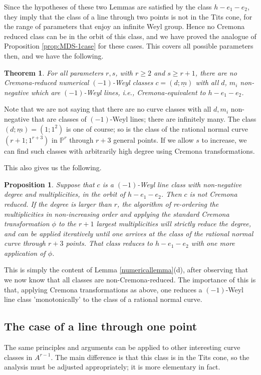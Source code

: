 \documentclass[12pt]{article}
\numberwithin{equation}{section}
\newtheorem{theorem}[equation]{Theorem}
\newtheorem{proposition}[equation]{Proposition}
\numberwithin{equation}{section}
\numberwithin{subeq}{equation}
\def\bbP{\mathbb{P}}
\begin{document}
Since the hypotheses of these two Lemmas 
are satisfied by the class $h-e_1-e_2$,
they imply that the class of a line through two points
is not in the Tits cone,
for the range of parameters that enjoy an infinite Weyl group.
Hence no Cremona reduced class can be in the orbit of this class, and we have proved the analogue of Proposition \ref{prop:MDS-1case} for these cases.
This covers all possible parameters then, and we have the following.

\begin{theorem}\label{thm:noCR-1}
For all parameters $r,s$, with $r \geq 2$ and $s \geq r+1$,
there are no Cremona-reduced numerical $(-1)$-Weyl classes
$c = (d;\underline{m})$
with all $d$, $m_i$ non-negative
which are $(-1)$-Weyl lines, i.e., Cremona-equivalent to $h-e_1-e_2$.
\end{theorem}

Note that we are not saying that there are no curve classes with all $d, m_i$ non-negative that are classes of $(-1)$-Weyl lines; there are infinitely many.
The class $(d;\underline{m}) = (1;1^2)$ is one of course;
so is the class of the rational normal curve
$(r+1;1^{r+3})$ in $\bbP^r$ through $r+3$ general points.
If we allow $s$ to increase, we can find such classes with arbitrarily high degree
using Cremona transformations.

This also gives us the following.

\begin{proposition}\label{monotonic}
Suppose that $c$ is a $(-1)$-Weyl line class with non-negative degree and multiplicities,
in the orbit of $h-e_1-e_2$.
Then $c$ is not Cremona reduced.
If the degree is larger than $r$,
the algorithm of re-ordering the multiplicities in non-increasing order
and applying the standard Cremona transformation $\phi$ to the $r+1$ largest multiplicities
will strictly reduce the degree, and can be applied iteratively
until one arrives at the class of the rational normal curve through $r+3$ points.
That class reduces to $h-e_1-e_2$ with one more application of $\phi$.
\end{proposition}

This is simply the content of Lemma \ref{numericallemma}(d),
after observing that we now know that all classes are non-Cremona-reduced.
The importance of this is that, applying Cremona transformations as above,
one reduces a $(-1)$-Weyl line class 'monotonically' to the class of a rational normal curve.

\subsection{The case of a line through one point}
The same principles and arguments can be applied to other interesting curve classes in $A^{r-1}$.
The main difference is that this class is in the Tits cone, so the analysis must be adjusted appropriately; it is more elementary in fact.
\end{document}
